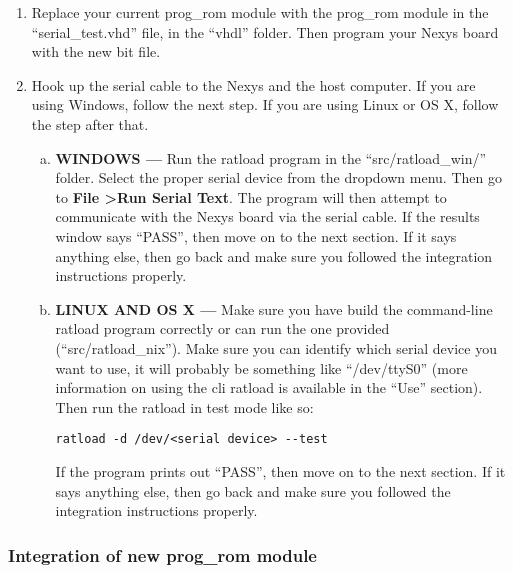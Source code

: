 \documentclass[notitlepage]{article}
\begin{document}
\begin{enumerate}
\item Replace your current prog\_rom module with the prog\_rom module in the ``serial\_test.vhd'' file, in the ``vhdl'' folder. Then program your Nexys board with the new bit file.
\item Hook up the serial cable to the Nexys and the host computer. If you are using Windows, follow the next step. If you are using Linux or OS X, follow the step after that.
  \begin{enumerate}[a.]
  \item \textbf{WINDOWS ---} Run the ratload program in the ``src/ratload\_win/'' folder. Select the proper serial device from the dropdown menu. Then go to \textbf{File \textgreater Run Serial Text}. The program will then attempt to communicate with the Nexys board via the serial cable. If the results window says ``PASS'', then move on to the next section. If it says anything else, then go back and make sure you followed the integration instructions properly.

  \item \textbf{LINUX AND OS X ---} Make sure you have build the command-line ratload program correctly or can run the one provided (``src/ratload\_nix''). Make sure you can identify which serial device you want to use, it will probably be something like ``/dev/ttyS0'' (more information on using the cli ratload is available in the ``Use'' section). Then run the ratload in test mode like so:
\begin{verbatim}
ratload -d /dev/<serial device> --test
\end{verbatim}
If the program prints out ``PASS'', then move on to the next section. If it says anything else, then go back and make sure you followed the integration instructions properly.
  \end{enumerate}
\end{enumerate}

\subsubsection{Integration of new prog\_rom module}
\end{document}
